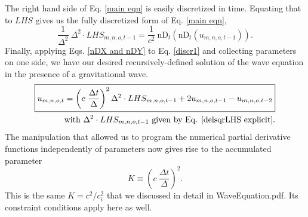 \documentclass{article}
\begin{document}
The right hand side of Eq. \ref{main eqn} is easily discretized in time. Equating that to $LHS$ gives us the fully discretized form of Eq. \ref{main eqn},
\begin{equation} \label{discr1}
\frac{1}{\Delta^2}\ \Delta^2 \cdot LHS_{m,n,o,t-1} = \frac{1}{c^2}\ \mbox{nD}_t(\mbox{nD}_t(u_{m,n,o,t-1})).
\end{equation}
Finally, applying Eqs. \ref{nDX and nDY} to Eq. \ref{discr1} and collecting parameters on one side, we have our desired recursively-defined solution of the wave equation in the presence of a gravitational wave.
\begin{align} \label{discr main eqn}
\boxed{
u_{m,n,o,t}=\left(c\ \frac{\Delta t}{\Delta}\right)^2 \Delta^2 \cdot LHS_{m,n,o,t-1}+2u_{m,n,o,t-1}-u_{m,n,o,t-2}
} \\
\text{with $\Delta^2 \cdot LHS_{m,n,o,t-1}$ given by Eq. \ref{delsqrLHS explicit}.} \nonumber
\end{align}
The manipulation that allowed us to program the numerical partial derivative functions independently of parameters now gives rise to the accumulated parameter
\begin{equation} \label{K}
K\equiv\left(c\ \frac{\Delta t}{\Delta}\right)^2.
\end{equation}
This is the same $K=c^2/c_i^2$ that we discussed in detail in WaveEquation.pdf. Its constraint conditions apply here as well.
\end{document}
